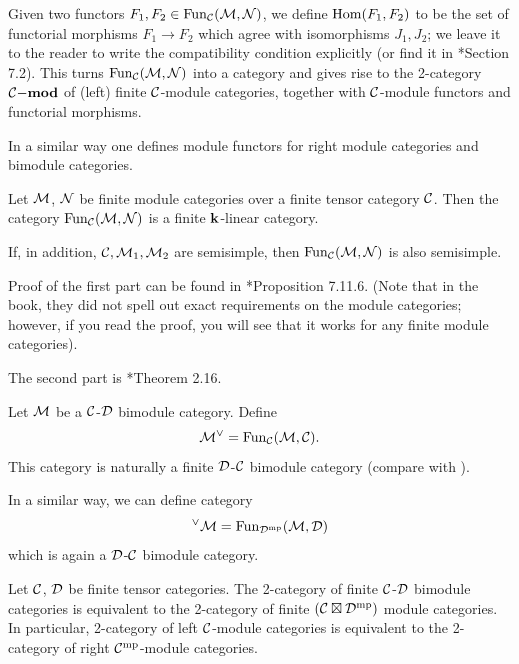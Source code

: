 Given two functors $F_1, F_2\in \operatorname{Fun}_{\mathcal{C}}(\mathcal{M}, \mathcal{N})$, we define
$\operatorname{Hom}(F_1, F_2)$ to be the set of functorial morphisms $F_1\to F_2$ which agree
with isomorphisms $J_1, J_2$; we leave it to the reader to write the
compatibility condition explicitly (or find it in
*{Section 7.2}). This turns $\operatorname{Fun}_{\mathcal{C}}(\mathcal{M}, \mathcal{N})$
into a category and gives rise to the 2-category $\mathcal{C}\mathbf{{-}mod}$ of (left) finite
$\mathcal{C}$-module categories, together with $\mathcal{C}$-module functors and functorial
morphisms.

In a similar way one defines module functors for right module categories
and bimodule categories.


\begin{theorem}\label{t:module-functors}
  Let $\mathcal{M}$, $\mathcal{N}$ be finite module categories over a finite tensor
   category $\mathcal{C}$. Then the category $\operatorname{Fun}_{\mathcal{C}}(\mathcal{M}, \mathcal{N})$ is
   a finite $\mathbf{k}$-linear category.

   If, in addition, $\mathcal{C}, \mathcal{M}_1, \mathcal{M}_2$ are semisimple, then
   $\operatorname{Fun}_{\mathcal{C}}(\mathcal{M}, \mathcal{N})$  is also semisimple.
\end{theorem}
Proof of the first part can be found in *{Proposition
7.11.6}. (Note that in the book, they did not spell out exact requirements on
the module categories; however, if you read the proof, you will see that it
works for any finite module categories).

The second part is *{Theorem 2.16}.

\begin{example}\label{x:module-cat-dual}
  Let $\mathcal{M}$ be a $\mathcal{C}$-$\mathcal{D}$ bimodule category. Define
  $$
  \mathcal{M}^\vee = \operatorname{Fun}_{\mathcal{C}}(\mathcal{M}, \mathcal{C}).
  $$
  This category is naturally a finite
  $\mathcal{D}$-$\mathcal{C}$ bimodule category (compare with ).

  In a similar way, we can define category
  $$
    {}^\vee\mathcal{M}= \operatorname{Fun}_{\mathcal{D}^{\mathrm{mp}}}(\mathcal{M}, \mathcal{D})
  $$
  which is again a $\mathcal{D}$-$\mathcal{C}$ bimodule category.
\end{example}




\begin{lemma}\label{l:bimodule-2category}
  Let $\mathcal{C}$, $\mathcal{D}$ be finite tensor categories. The 2-category of finite
  $\mathcal{C}$-$\mathcal{D}$ bimodule categories is equivalent to the 2-category of finite
  $(\mathcal{C}\boxtimes \mathcal{D}^{{\mathrm{mp}}})$ module categories. In particular, 2-category
  of
  left $\mathcal{C}$-module categories is equivalent to the 2-category of right
  $\mathcal{C}^{\mathrm{mp}}$-module categories.
\end{lemma}



